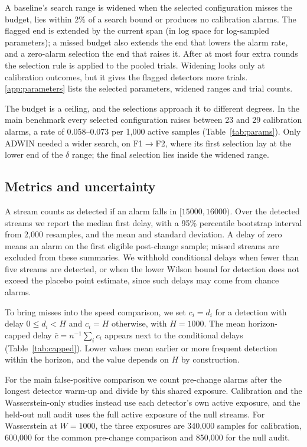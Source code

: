\documentclass[preprint,12pt]{elsarticle}
\begin{document}
A baseline's search range is widened when the selected configuration misses the budget, lies within 2\% of a search bound or produces no calibration alarms. The flagged end is extended by the current span (in log space for log-sampled parameters); a missed budget also extends the end that lowers the alarm rate, and a zero-alarm selection the end that raises it. After at most four extra rounds the selection rule is applied to the pooled trials. Widening looks only at calibration outcomes, but it gives the flagged detectors more trials. \ref{app:parameters} lists the selected parameters, widened ranges and trial counts.

The budget is a ceiling, and the selections approach it to different degrees. In the main benchmark every selected configuration raises between 23 and 29 calibration alarms, a rate of 0.058--0.073 per 1,000 active samples (Table~\ref{tab:params}). Only ADWIN needed a wider search, on F1$\to$F2, where its first selection lay at the lower end of the $\delta$ range; the final selection lies inside the widened range.

\subsection{Metrics and uncertainty}
\label{sec:metrics}
A stream counts as detected if an alarm falls in $[15000,16000)$. Over the detected streams we report the median first delay, with a 95\% percentile bootstrap interval from 2,000 resamples, and the mean and standard deviation. A delay of zero means an alarm on the first eligible post-change sample; missed streams are excluded from these summaries. We withhold conditional delays when fewer than five streams are detected, or when the lower Wilson bound for detection does not exceed the placebo point estimate, since such delays may come from chance alarms.

To bring misses into the speed comparison, we set $c_i=d_i$ for a detection with delay $0\leq d_i<H$ and $c_i=H$ otherwise, with $H=1000$. The mean horizon-capped delay $\bar c=n^{-1}\sum_i c_i$ appears next to the conditional delays (Table~\ref{tab:capped}). Lower values mean earlier or more frequent detection within the horizon, and the value depends on $H$ by construction.

For the main false-positive comparison we count pre-change alarms after the longest detector warm-up and divide by this shared exposure. Calibration and the Wasserstein-only studies instead use each detector's own active exposure, and the held-out null audit uses the full active exposure of the null streams. For Wasserstein at $W=1000$, the three exposures are 340,000 samples for calibration, 600,000 for the common pre-change comparison and 850,000 for the null audit.
\end{document}
